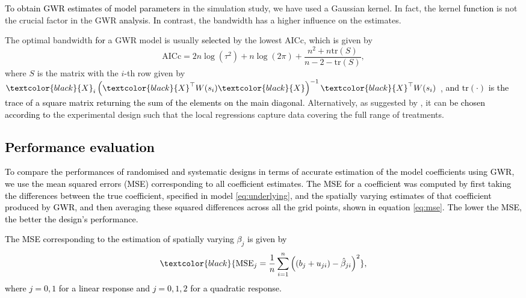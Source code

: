 \documentclass[a4paper]{article} 	%
\newcommand{\tr}{\mathrm{tr}}
\newcommand{\R}{\texttt{R}}
\newcommand{\revision}[1]{\textcolor{black}{#1}}
\newcommand{\zc}[1]{\textcolor{black}{#1}}
\begin{document}
\revision{To obtain GWR estimates of model parameters} in the simulation study, we have used a Gaussian kernel. In fact, the kernel \revision{function} is not the crucial factor in the GWR \revision{analysis}. \revision{In} contrast, the bandwidth has a higher influence on the estimates. 


The optimal bandwidth \revision{for} a GWR model is usually \revision{selected} by the lowest AICc, which is given by 
\begin{equation}\label{eq:aicc}
	\mbox{AICc} = 2n\log (\tau^2) + n \log (2\pi) + \frac{n^2+n\tr (S)}{n-2-\tr (S)},
\end{equation}
where $S$ is the matrix with the $i$-th row given by $\revision{X}_i\left( \revision{X}^\top W(s_i) \revision{X} \right)^{-1}\revision{X}^\top W(s_i)$ \parencite{Evans2020Assessment}, \zc{and $\tr(\cdot)$ is the trace of a square matrix returning the sum of the elements on the main diagonal.} Alternatively, as suggested by \textcite{Rakshit2020Novel}, it can \zc{be chosen according to} the experimental design such that the local regressions capture data covering the full range of treatments.



\subsection{\revision{Performance evaluation}}


\zc{To compare the performances of randomised and systematic designs in terms of accurate estimation of the model coefficients using GWR, we use the mean squared errors (MSE) corresponding to all coefficient estimates.} \revision{The MSE for a coefficient was computed by first taking the differences between the true coefficient, specified in model \eqref{eq:underlying}, and the spatially varying estimates of that coefficient produced by GWR, and then averaging these squared differences across all the grid points, shown in equation \eqref{eq:mse}. The lower the MSE, the better the design's performance.} 

\revision{The MSE corresponding to the estimation of spatially varying $\beta_{j}$ is given by}
\begin{equation}\label{eq:mse}
\zc{\text{MSE}_j = \frac{1}{n} \sum_{i=1}^{n} \left( (b_j+u_{ji}) - \hat{\beta}_{ji} \right)^2},
\end{equation}
\zc{where $j = 0, 1$ for a linear response and $j = 0, 1, 2$ for a quadratic response.}
\end{document}
